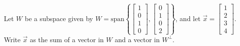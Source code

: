 \documentclass{ximera}
\begin{document}
\begin{example}\label{ex:OrthogDecomp}
Let $W$ be a subspace given by $W = \mbox{span}\left\{\begin{bmatrix}
  1 \\ 0 \\ 1 \\ 0
  \end{bmatrix},
  \begin{bmatrix}
  0 \\ 1 \\ 0 \\ 2
\end{bmatrix}\right\}$, and let $\vec{x}=\begin{bmatrix}
  1 \\ 2 \\ 3 \\ 4
  \end{bmatrix}$.  Write $\vec{x}$ as the sum of a vector in $W$ and a vector in $W^\perp$.
  

\end{example}
\end{document}
